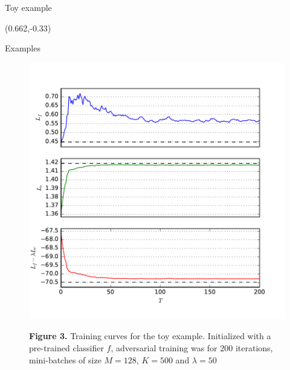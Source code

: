 \documentclass[final,unknownkeysallowed]{beamer}
\begin{document}
\begin{frame}{}
\begin{textblock}{0.32}
\begin{block}{Toy example \phantom{p}}
\end{block}

\end{textblock}


\vspace{-0.3cm}


\begin{textblock}{0.32}(0.662,-0.33)

\begin{block}{Examples \phantom{p}}

\vspace{-0.8cm}
\begin{figure}
\centering
\begin{minipage}{.42\linewidth}
    \begin{center}
        \includegraphics[width=\textwidth]{figures/training.pdf}\vspace{-1em}
    \end{center}
    {\bf Figure 3.} Training curves for the toy example.
    Initialized with a pre-trained classifier $f$, adversarial training was for $200$ iterations, mini-batches of size $M=128$, $K=500$ and $\lambda=50$
\end{minipage}
\hspace{.05\linewidth}

\end{figure}
\end{block}
\end{textblock}
\end{frame}
\end{document}
